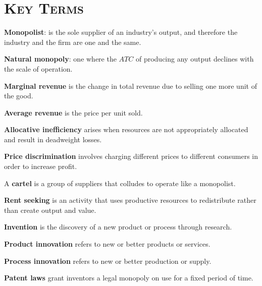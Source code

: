 \newpage
{}
	\section*{\textsc{Key Terms}}
\begin{keyterms}
\textbf{Monopolist}: is the sole supplier of an industry's output, and therefore the industry and the firm are one and the same.

\textbf{Natural monopoly}: one where the $ATC$ of producing any output declines with the scale of operation.

\textbf{Marginal revenue} is the change in total revenue due to selling one more unit of the good.

\textbf{Average revenue} is the price per unit sold.

\textbf{Allocative inefficiency} arises when resources are not appropriately allocated and result in deadweight losses.

\textbf{Price discrimination} involves charging different prices to different consumers in order to increase profit.

A \textbf{cartel} is a group of suppliers that colludes to operate like a monopolist.

\textbf{Rent seeking} is an activity that uses productive resources to redistribute rather than create output and value.

\textbf{Invention} is the discovery of a new product or process through research.

\textbf{Product innovation} refers to new or better products or services.

\textbf{Process innovation} refers to new or better production or supply.

\textbf{Patent laws} grant inventors a legal monopoly on use for a fixed period of time.
\end{keyterms}
